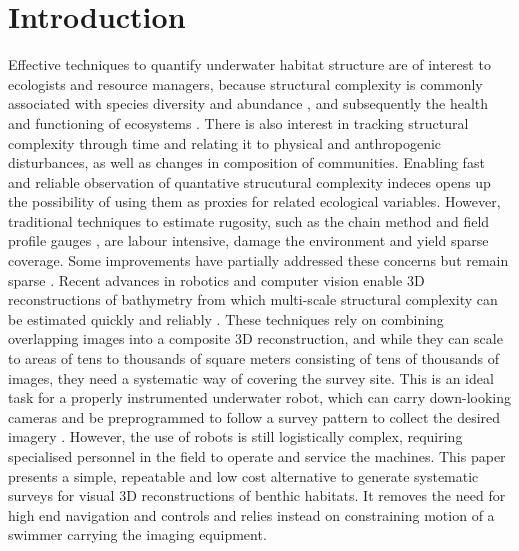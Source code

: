 \section{Introduction} 


Effective techniques to quantify underwater habitat structure are of interest to ecologists and resource managers, because structural complexity is commonly associated with species diversity and abundance \cite{pending}, and subsequently the health and functioning of ecosystems \cite{pending}. There is also interest in tracking structural complexity through time and relating it to physical and anthropogenic disturbances, as well as changes in composition of communities. Enabling fast and reliable observation of quantative strucutural complexity indeces opens up the possibility of using them as proxies for related ecological variables.
However, traditional techniques to estimate rugosity, such as the chain method \cite{Luckhurst_1978} \cite{Friedlander_1998} and field profile gauges \cite{McCormick_1994}, are labour intensive, damage the environment and yield sparse coverage. Some improvements have partially addressed these concerns but remain sparse \cite{Dustan_2013}.  Recent advances in robotics and computer vision enable 3D reconstructions of bathymetry from which multi-scale structural complexity can be estimated quickly and reliably \cite{Friedman_2012}. These techniques rely on combining overlapping images into a composite 3D reconstruction, and while they can scale to areas of tens to thousands of square meters consisting of tens of thousands of images, they need a systematic way of covering the survey site. This is an ideal task for a properly instrumented underwater robot, which can carry down-looking cameras and be preprogrammed to follow a survey pattern to collect the desired imagery \cite{Williams_2012}. However, the use of robots is still logistically complex, requiring specialised personnel in the field to operate and service the machines.
This paper presents a simple, repeatable and low cost alternative to generate systematic surveys for visual 3D reconstructions of benthic habitats. It removes the need for high end navigation and controls and relies instead on constraining motion of a swimmer carrying the imaging equipment. 

